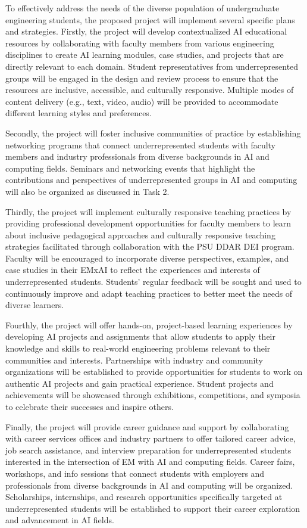 \documentclass[11pt]{article}
\begin{document}
To effectively address the needs of the diverse population of undergraduate engineering students, the proposed project will implement several specific plans and strategies. Firstly, the project will develop contextualized AI educational resources by collaborating with faculty members from various engineering disciplines to create AI learning modules, case studies, and projects that are directly relevant to each domain. Student representatives from underrepresented groups will be engaged in the design and review process to ensure that the resources are inclusive, accessible, and culturally responsive. Multiple modes of content delivery (e.g., text, video, audio) will be provided to accommodate different learning styles and preferences.

Secondly, the project will foster inclusive communities of practice by establishing networking programs that connect underrepresented students with faculty members and industry professionals from diverse backgrounds in AI and computing fields.  Seminars and networking events that highlight the contributions and perspectives of underrepresented groups in AI and computing will also be organized as discussed in Task 2.

Thirdly, the project will implement culturally responsive teaching practices by providing professional development opportunities for faculty members to learn about inclusive pedagogical approaches and culturally responsive teaching strategies facilitated through collaboration with the PSU DDAR DEI program.
Faculty will be encouraged to incorporate diverse perspectives, examples, and case studies in their EMxAI to reflect the experiences and interests of underrepresented students. Students' regular feedback will be sought and used to continuously improve and adapt teaching practices to better meet the needs of diverse learners.

Fourthly, the project will offer hands-on, project-based learning experiences by developing AI projects and assignments that allow students to apply their knowledge and skills to real-world engineering problems relevant to their communities and interests. Partnerships with industry and community organizations will be established to provide opportunities for students to work on authentic AI projects and gain practical experience. Student projects and achievements will be showcased through exhibitions, competitions, and symposia to celebrate their successes and inspire others.

Finally, the project will provide career guidance and support by collaborating with career services offices and industry partners to offer tailored career advice, job search assistance, and interview preparation for underrepresented students interested in the intersection of EM with AI and computing fields. Career fairs, workshops, and info sessions that connect students with employers and professionals from diverse backgrounds in AI and computing will be organized. Scholarships, internships, and research opportunities specifically targeted at underrepresented students will be established to support their career exploration and advancement in AI fields.
\end{document}
